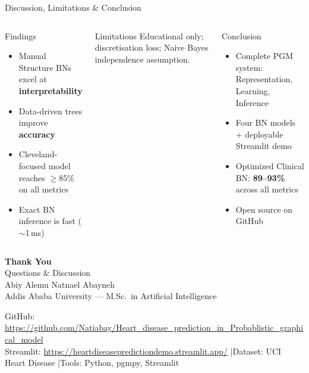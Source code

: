 \documentclass[aspectratio=169,11pt]{beamer}
\begin{document}
\begin{frame}{Discussion, Limitations \& Conclusion}
  \begin{columns}[T]
    \begin{block}{Findings}
      \small
      \begin{itemize}
        \item Manual Structure BNs excel at \textbf{interpretability}
        \item Data-driven trees improve \textbf{accuracy}
        \item Cleveland-focused model reaches $\geq$85\% on all metrics
        \item Exact BN inference is fast ($\sim$1\,ms)
      \end{itemize}
    \end{block}
    \begin{alertblock}{Limitations}
      \small Educational only; discretisation loss; Naive Bayes independence assumption.
    \end{alertblock}
    \begin{block}{Conclusion}
      \begin{itemize}
        \item Complete PGM system: Representation, Learning, Inference
        \item Four BN models + deployable Streamlit demo
        \item Optimized Clinical BN: \textbf{89--93\%} across all metrics
        \item Open source on GitHub
      \end{itemize}
    \end{block}
  \end{columns}
\end{frame}

\begin{frame}[plain]
  \begin{center}
    \vspace{1cm}
    {\Huge\bfseries\color{AAUBlue} Thank You}\\[0.5cm]
    {\Large Questions \& Discussion}\\[1cm]
    {\large Abiy Alemu \quad\textbar\quad Natnael Abayneh}\\[0.25cm]
    {\normalsize Addis Ababa University --- M.Sc.\ in Artificial Intelligence}\\[0.9cm]
    \begin{tcolorbox}[width=0.78\textwidth, colframe=AccentTeal, title=Resources]
      \small
      GitHub: \url{https://github.com/Natiabay/Heart_disease_prediction_in_Probablistic_graphical_model}\\
      Streamlit: \url{https://heartdiseasepredictiondemo.streamlit.app/} \quad|\quad Dataset: UCI Heart Disease \quad|\quad Tools: Python, pgmpy, Streamlit
    \end{tcolorbox}
  \end{center}
\end{frame}
\end{document}
